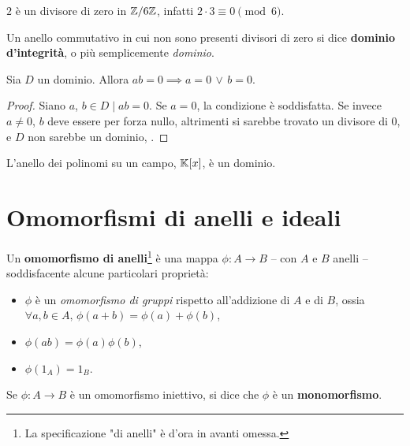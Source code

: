 \begin{example}
    $2$ è un divisore di zero in $\mathbb Z/6\mathbb Z$, infatti $2 \cdot 3 \equiv 0 \pmod 6.$
\end{example}

\begin{definition}
    Un anello commutativo in cui non sono presenti divisori di zero si dice \textbf{dominio d'integrità},
    o più semplicemente \textit{dominio}.
\end{definition}

\begin{proposition}
    Sia $D$ un dominio. Allora $ab=0 \implies a=0 \,\lor\, b=0$.
\end{proposition}

\begin{proof}
    Siano $a$, $b \in D \mid ab = 0$. Se $a=0$, la condizione è soddisfatta.
    Se invece $a \neq 0$, $b$ deve essere per forza nullo, altrimenti si
    sarebbe trovato un divisore di $0$, e $D$ non sarebbe un dominio, \Lightning.
\end{proof}

\begin{example}
    L'anello dei polinomi su un campo, $\mathbb{K}[x]$, è un dominio.
\end{example}

\section{Omomorfismi di anelli e ideali}

\begin{definition}
    Un \textbf{omomorfismo di anelli}\footnote{La specificazione "di anelli" è d'ora in avanti omessa.} è una mappa $\phi : A \to B$ -- con
    $A$ e $B$ anelli -- soddisfacente alcune particolari proprietà:

    \begin{itemize}
        \item $\phi$ è un \textit{omomorfismo di gruppi} rispetto all'addizione
              di $A$ e di $B$, ossia $\forall a, b \in A, \, \phi(a+b)=\phi(a)+\phi(b)$,
        \item $\phi(ab)=\phi(a)\phi(b)$,
        \item $\phi(1_A)=1_B$.
    \end{itemize}
\end{definition}

\begin{definition}
    Se $\phi : A \to B$ è un omomorfismo iniettivo, si dice che
    $\phi$ è un \textbf{monomorfismo}.
\end{definition}

